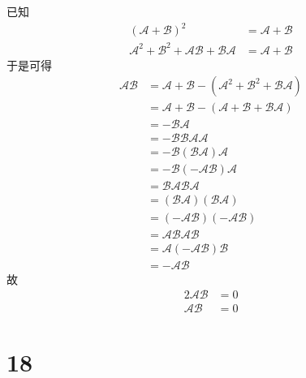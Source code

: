 \documentclass{article}
\begin{document}
已知
\begin{align*}
  (\mathscr{A} + \mathscr{B})^2                                                   & = \mathscr{A} + \mathscr{B} \\
  \mathscr{A}^2 + \mathscr{B}^2 + \mathscr{A}\mathscr{B} + \mathscr{B}\mathscr{A} & = \mathscr{A} + \mathscr{B}
\end{align*}
于是可得
\begin{align*}
  \mathscr{A}\mathscr{B}
   & = \mathscr{A} + \mathscr{B} - (\mathscr{A}^2 + \mathscr{B}^2 + \mathscr{B}\mathscr{A}) \\
   & = \mathscr{A} + \mathscr{B} - (\mathscr{A} + \mathscr{B} + \mathscr{B}\mathscr{A})     \\
   & = - \mathscr{B}\mathscr{A}                                                             \\
   & = - \mathscr{B} \mathscr{B} \mathscr{A} \mathscr{A}                                    \\
   & = - \mathscr{B} (\mathscr{B} \mathscr{A}) \mathscr{A}                                  \\
   & = - \mathscr{B} (-\mathscr{A}\mathscr{B}) \mathscr{A}                                  \\
   & = \mathscr{B} \mathscr{A} \mathscr{B} \mathscr{A}                                      \\
   & = (\mathscr{B} \mathscr{A}) (\mathscr{B} \mathscr{A})                                  \\
   & = (-\mathscr{A}\mathscr{B})(-\mathscr{A}\mathscr{B})                                   \\
   & = \mathscr{A}\mathscr{B}\mathscr{A}\mathscr{B}                                         \\
   & = \mathscr{A}(-\mathscr{A}\mathscr{B})\mathscr{B}                                      \\
   & = - \mathscr{A}\mathscr{B}
\end{align*}
故
\begin{align*}
  2 \mathscr{A}\mathscr{B} & = 0 \\
  \mathscr{A}\mathscr{B}   & = 0 
\end{align*}

\section*{18}
\end{document}
